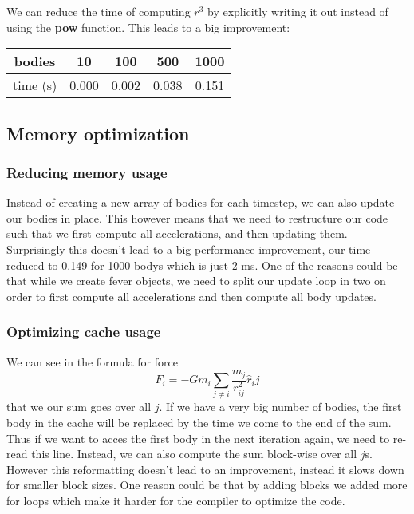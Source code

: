 \documentclass[a4paper]{scrartcl}
\begin{document}
            We can reduce the time of computing $r^3$ by explicitly writing it
            out instead of using the \textbf{pow} function. This leads to a big improvement:
            \newline
            \noindent\begin{tabular}{c|c|c|c|c}
                bodies & 10 & 100 & 500 & 1000 \\
                \hline
                time (s) & 0.000 & 0.002 & 0.038 & 0.151\\
            \end{tabular}


        \subsection{Memory optimization}
            \subsubsection{Reducing memory usage}\label{sec:mem_usage}
                Instead of creating a new array of bodies for each timestep, we
                can also update our bodies in place. This however means that we
                need to restructure our code such that we first compute all
                accelerations, and then updating them. Surprisingly this doesn't
                lead to a big performance improvement, our time reduced to 0.149
                for 1000 bodys which is just 2 ms. One of the reasons could be
                that while we create fever objects, we need to split our update
                loop in two on order to first compute all accelerations and then
                compute all body updates.

            \subsubsection{Optimizing cache usage}\label{sec:cache_blocking}
                We can see in the formula for force
                \begin{equation}\label{for:force}
                    F_i = -Gm_i \sum_{j\neq i} \frac{m_j}{r^2_{ij}}\hat{r}_ij
                \end{equation}
                that we our sum goes over all $j$. If we have a very big number
                of bodies, the first body in the cache will be replaced by the
                time we come to the end of the sum. Thus if we want to acces the
                first body in the next iteration again, we need to re-read this
                line. Instead, we can also compute the sum block-wise over all
                $j$s. However this reformatting doesn't lead to an improvement,
                instead it slows down for smaller block sizes. One reason could
                be that by adding blocks we added more for loops which make it
                harder for the compiler to optimize the code.
\end{document}
